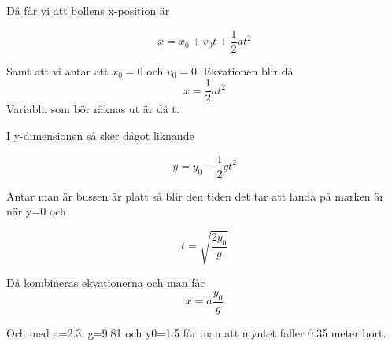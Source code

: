 \documentclass[a4paper,12pt]{article}
\begin{document}
\begin{enumerate}
    Då får vi att bollens x-position är

    $$x=x_0+v_0t+\frac{1}{2}at^2$$

    Samt att vi antar att $x_0=0$ och $v_0=0$. 
    Ekvationen blir då 
    $$x=\frac{1}{2}at^2$$
    Variabln som bör räknas ut är då t.
    
    I y-dimensionen så sker dågot liknande

    $$y=y_0-\frac{1}{2}gt^2$$
    
    Antar man är bussen är platt så blir 
    den tiden det tar att landa på marken är när y=0 och

    $$t=\sqrt{\frac{2y_0}{g}}$$ 

    Då kombineras ekvationerna och man får
    $$x=a\frac{y_0}{g}$$

    Och med a=2.3, g=9.81 och y0=1.5 får man att 
    myntet faller 0.35 meter bort.

\end{enumerate}
\end{document}
